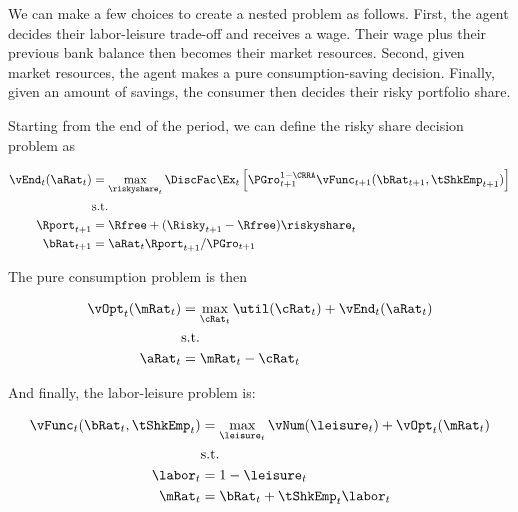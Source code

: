 \documentclass[\econtexRoot/SequentialEGM]{subfiles}
\begin{document}
We can make a few choices to create a nested problem as follows. First, the
agent decides their labor-leisure trade-off and receives a wage. Their wage
plus their previous bank balance then becomes their market resources. Second, given
market resources, the agent makes a pure consumption-saving decision. Finally, given an amount of savings, the consumer then decides their risky portfolio share.

Starting from the end of the period, we can define the risky share decision problem as

\begin{equation}
        \begin{split}
                \vEnd_{t}(\aRat_{t}) & = \max_{\riskyshare_{t}} \DiscFac
                \Ex_{t} \left[ \PGro_{t+1}^{1-\CRRA}
                        \vFunc_{t+1}(\bRat_{t+1},
                        \tShkEmp_{t+1}) \right] \\
                & \text{s.t.} \\
                \Rport_{t+1} & = \Rfree + (\Risky_{t+1} - \Rfree)
                \riskyshare_{t} \\
                \bRat_{t+1} & = \aRat_{t} \Rport_{t+1} / \PGro_{t+1}
        \end{split}
\end{equation}

The pure consumption problem is then

\begin{equation}
        \begin{split}
                \vOpt_{t}(\mRat_{t}) & = \max_{\cRat_{t}} \util(\cRat_{t}) + \vEnd_{t}(\aRat_{t}) \\
                & \text{s.t.} \\
                \aRat_{t} & = \mRat_{t} - \cRat_{t}
        \end{split}
\end{equation}

And finally, the labor-leisure problem is:

\begin{equation}
        \begin{split}
                \vFunc_{t}(\bRat_{t}, \tShkEmp_{t}) & = \max_{ \leisure_{t}}
                \vNum(\leisure_{t}) + \vOpt_{t} (\mRat_{t}) \\
                & \text{s.t.} \\
                \labor_{t} & = 1 - \leisure_{t} \\
                \mRat_{t} & = \bRat_{t} + \tShkEmp_{t}\labor_{t} \\
        \end{split}
\end{equation}
\end{document}

